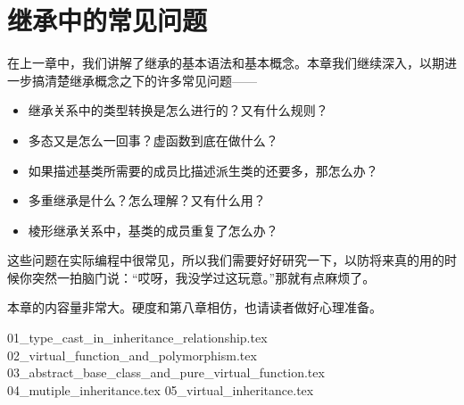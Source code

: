 \chapter{继承中的常见问题}
在上一章中，我们讲解了继承的基本语法和基本概念。本章我们继续深入，以期进一步搞清楚继承概念之下的许多常见问题——
\begin{itemize}
    \item 继承关系中的类型转换是怎么进行的？又有什么规则？\par
    \item 多态又是怎么一回事？虚函数到底在做什么？\par
    \item 如果描述基类所需要的成员比描述派生类的还要多，那怎么办？\par
    \item 多重继承是什么？怎么理解？又有什么用？\par
    \item 棱形继承关系中，基类的成员重复了怎么办？\par
\end{itemize}
这些问题在实际编程中很常见，所以我们需要好好研究一下，以防将来真的用的时候你突然一拍脑门说：``哎呀，我没学过这玩意。''那就有点麻烦了。\par
本章的内容量非常大。硬度和第八章相仿，也请读者做好心理准备。\par
{01_type_cast_in_inheritance_relationship.tex}
{02_virtual_function_and_polymorphism.tex}
{03_abstract_base_class_and_pure_virtual_function.tex}
{04_mutiple_inheritance.tex}
{05_virtual_inheritance.tex}

